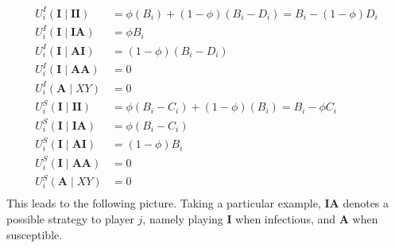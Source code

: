 \documentclass{article}
\theoremstyle{definition}
\theoremstyle{exercise}
\theoremstyle{remark}
\begin{document}
\begin{align*}
    U_i^{I}(\bm{I} \;|\; \bm{II}) &= \phi(B_i) + (1 - \phi)(B_i - D_i) = B_i - (1 - \phi) D_i  \\
    U_i^{I}(\bm{I} \;|\; \bm{IA}) &= \phi B_i \\
    U_i^{I}(\bm{I} \;|\; \bm{AI}) &=  (1 - \phi)(B_i - D_i)\\
    U_i^{I}(\bm{I} \;|\; \bm{AA}) &=  0 \\
    U_i^{I}(\bm{A} \;|\; XY) &= 0 \\
    U_i^{S}(\bm{I} \;|\; \bm{II}) &= \phi(B_i - C_i) + (1 - \phi)(B_i) = B_i - \phi C_i  \\
    U_i^{S}(\bm{I} \;|\; \bm{IA}) &=  \phi(B_i - C_i) \\
    U_i^{S}(\bm{I} \;|\; \bm{AI}) &=  (1 - \phi)B_i \\
    U_i^{S}(\bm{I} \;|\; \bm{AA}) &=  0\\
    U_i^{S}(\bm{A} \;|\; XY) &=  0 \\
\end{align*}
This leads to the following picture. Taking a particular example, $\bm{IA}$ denotes a possible strategy to player $j$, namely playing $\bm{I}$ when infectious, and $\bm{A}$ when susceptible.
\end{document}
